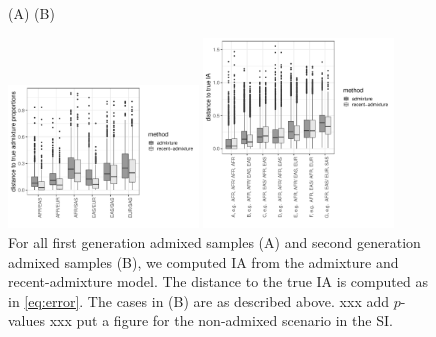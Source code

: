 \documentclass[12pt]{article}
\theoremstyle{definition}
\begin{document}
\begin{figure}[htb]
  \hspace{3cm} (A) \hspace{8cm} (B)
  \begin{center}
    \parbox[b]{0.45\textwidth}{\includegraphics[width=0.45\textwidth]{deviations_mixed.pdf}\vspace{2cm}}
    \hspace{1cm}
    \parbox[b]{0.45\textwidth}{\includegraphics[width=0.45\textwidth]{deviations_mixed_cases.pdf}}
  \end{center}
  \caption{\label{fig:mixed_cases} For all first generation admixed
    samples (A) and second generation admixed samples (B), we computed
    IA from the admixture and recent-admixture model. The distance to
    the true IA is computed as in \eqref{eq:error}. The cases in (B)
    are as described above. xxx add $p$-values xxx put a figure for
    the non-admixed scenario in the SI.}
\end{figure}
\end{document}
